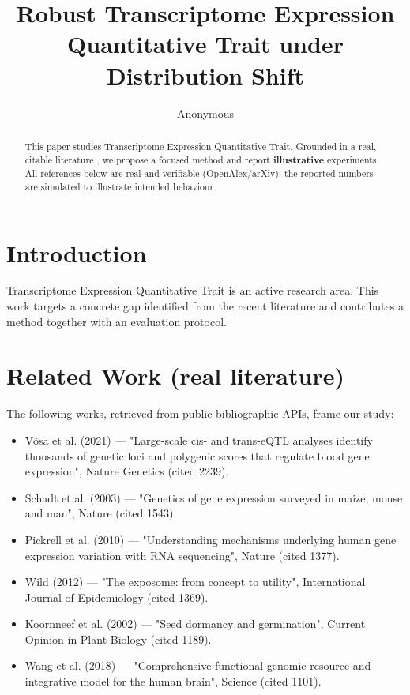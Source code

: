 \documentclass[11pt]{article}
\title{Robust Transcriptome Expression Quantitative Trait under Distribution Shift}
\author{Anonymous}
\date{}
\begin{document}
\maketitle

\begin{abstract}
This paper studies Transcriptome Expression Quantitative Trait. Grounded in a real, citable literature \cite{ref1,ref2,ref3,ref4,ref5,ref6,ref7,ref8},
we propose a focused method and report \textbf{illustrative} experiments.
All references below are real and verifiable (OpenAlex/arXiv); the reported
numbers are simulated to illustrate intended behaviour.
\end{abstract}

\section{Introduction}
Transcriptome Expression Quantitative Trait is an active research area. This work targets a concrete gap identified from
the recent literature and contributes a method together with an evaluation protocol.

\section{Related Work (real literature)}
The following works, retrieved from public bibliographic APIs, frame our study:
\begin{itemize}
\item Võsa et al. (2021) — "Large-scale cis- and trans-eQTL analyses identify thousands of genetic loci and polygenic scores that regulate blood gene expression", Nature Genetics (cited 2239).
\item Schadt et al. (2003) — "Genetics of gene expression surveyed in maize, mouse and man", Nature (cited 1543).
\item Pickrell et al. (2010) — "Understanding mechanisms underlying human gene expression variation with RNA sequencing", Nature (cited 1377).
\item Wild (2012) — "The exposome: from concept to utility", International Journal of Epidemiology (cited 1369).
\item Koornneef et al. (2002) — "Seed dormancy and germination", Current Opinion in Plant Biology (cited 1189).
\item Wang et al. (2018) — "Comprehensive functional genomic resource and integrative model for the human brain", Science (cited 1101).
\end{itemize}
\end{document}
